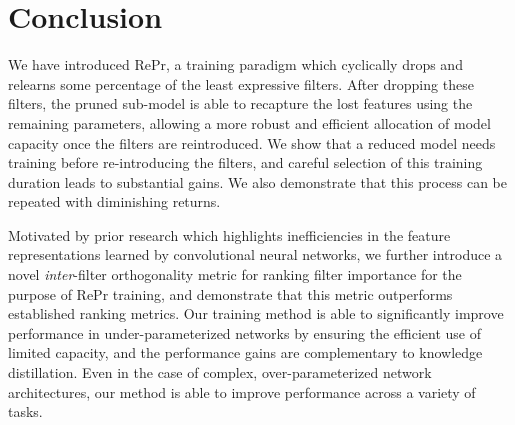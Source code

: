 \section{Conclusion} \label{sec:conclusion}
We have introduced RePr, a training paradigm which cyclically drops and relearns some percentage of the least expressive filters.
After dropping these filters, the pruned sub-model is able to recapture the lost features using the remaining parameters, allowing a more robust and efficient allocation of model capacity once the filters are reintroduced.
We show that a reduced model needs training before re-introducing the filters, and careful selection of this training duration leads to substantial gains. 
We also demonstrate that this process can be repeated with diminishing returns.

Motivated by prior research which highlights inefficiencies in the feature representations learned by convolutional neural networks, we further introduce a novel \textit{inter}-filter orthogonality metric for ranking filter importance for the purpose of RePr training, and demonstrate that this metric outperforms established ranking metrics.
Our training method is able to significantly improve performance in under-parameterized networks by ensuring the efficient use of limited capacity, and the performance gains are complementary to knowledge distillation.
Even in the case of complex, over-parameterized network architectures, our method is able to improve performance across a variety of tasks.